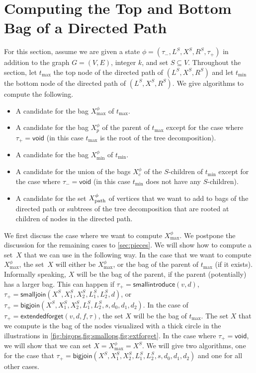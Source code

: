 \documentclass[a4paper,UKenglish,cleveref, autoref, thm-restate, numberwithinsect]{lipics-v2021}
\newcounter{algorithm}
\newcommand{\bigjoin}{\mathsf{bigjoin}}
\newcommand{\smallintroduce}{\mathsf{smallintroduce}}
\newcommand{\smalljoin}{\mathsf{smalljoin}}
\newcommand{\extendedforget}{\mathsf{extendedforget}}
\newcommand{\void}{\mathsf{void}}
\newcommand{\dpath}{\textup{path}}
\begin{document}
\section{Computing the Top and Bottom Bag of a Directed Path}\label{sec:bags}
For this section, assume we are given a state $\phi=(\tau_-,L^S, X^S, R^S,\tau_+)$ in addition to the graph $G=(V,E)$, integer $k$, and set $S\subseteq V$. Throughout the section, let $t_{\max}$ the top node of the directed path of $(L^S, X^S, R^S)$ and let $t_{\min}$ the bottom node of the directed path of $(L^S, X^S, R^S)$.
We give algorithms to compute the following.
\begin{itemize}
    \item A candidate for the bag $X^\phi_{\max}$ of $t_{\max}$.
        \item A candidate for the bag $X_p^\phi$ of the parent of $t_{\max}$ except for the case where $\tau_+=\void$ (in this case $t_{\max}$ is the root of the tree decomposition).
    \item A candidate for the bag $X^\phi_{\min}$ of $t_{\min}$.
    \item A candidate for the union of the bags $X_c^\phi$ of the $S$-children of $t_{\min}$ except for the case where $\tau_-=\void$ (in this case $t_{\min}$ does not have any $S$-children).
    \item A candidate for the set $X^\phi_{\dpath}$ of vertices that we want to add to bags of the directed path or subtrees of the tree decomposition that are rooted at children of nodes in the directed path.
\end{itemize}



We first discuss the case where we want to compute $X^\phi_{\max}$.  We postpone the discussion for the remaining cases to \cref{sec:pieces}.
We will show how to compute a set~$X$ that we can use in the following way. 
In the case that we want to compute $X^\phi_{\max}$, the set~$X$ will either be $X^\phi_{\max}$, or the bag of the parent of $t_{\max}$ (if it exists). Informally speaking, $X$ will be the bag of the parent, if the parent (potentially) has a larger bag. This can happen if $\tau_+=\smallintroduce(v,d)$, $\tau_+=\smalljoin(X^S,X_1^S,X_2^S,L_{1}^S, L_{2}^S,d)$, or $\tau_+=\bigjoin(X^S,X_1^S,X_2^S,L_{1}^S, L_{2}^S,s,d_0,d_1,d_2)$.
In the case of $\tau_+=\extendedforget(v,d,f,\tau)$, the set $X$ will be the bag of $t_{\max}$.
The set $X$ that we compute is the bag of the nodes visualized with a thick circle in the illustrations in \cref{fig:bigops,fig:smallops,fig:extforget}. 
In the case where $\tau_+=\void$, we will show that we can set $X=X^\phi_{\max}=X^S$. We will give two algorithms, one for the case that $\tau_+=\bigjoin(X^S,X_1^S,X_2^S,L_{1}^S, L_{2}^S,s,d_0,d_1,d_2)$ and one for all other cases.
 
\end{document}
